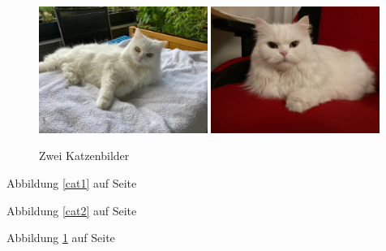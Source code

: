 \documentclass[12pt,ngerman]{scrartcl}
\begin{document}
\begin{figure}
\centering
{}
{\includegraphics[width=0.49\textwidth]{Bilder/Katze1}}
{\includegraphics[width=0.49\textwidth]{Bilder/Katze2}}
\caption{Zwei Katzenbilder}\label{katzenbilder}
\end{figure}

Abbildung \ref{cat1} auf Seite \pageref{katzenbilder}

Abbildung \ref{cat2} auf Seite \pageref{katzenbilder}

Abbildung \ref{katzenbilder} auf Seite \pageref{katzenbilder}
\end{document}
